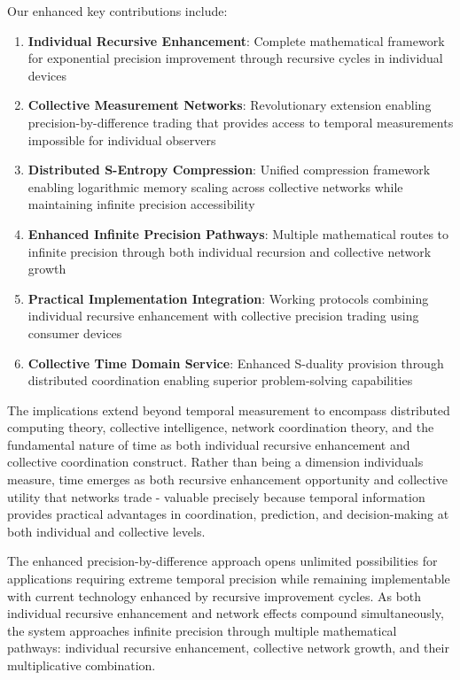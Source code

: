 \documentclass[12pt,a4paper]{article}
\begin{document}
Our enhanced key contributions include:

\begin{enumerate}
\item \textbf{Individual Recursive Enhancement}: Complete mathematical framework for exponential precision improvement through recursive cycles in individual devices

\item \textbf{Collective Measurement Networks}: Revolutionary extension enabling precision-by-difference trading that provides access to temporal measurements impossible for individual observers

\item \textbf{Distributed S-Entropy Compression}: Unified compression framework enabling logarithmic memory scaling across collective networks while maintaining infinite precision accessibility

\item \textbf{Enhanced Infinite Precision Pathways}: Multiple mathematical routes to infinite precision through both individual recursion and collective network growth

\item \textbf{Practical Implementation Integration}: Working protocols combining individual recursive enhancement with collective precision trading using consumer devices

\item \textbf{Collective Time Domain Service}: Enhanced S-duality provision through distributed coordination enabling superior problem-solving capabilities
\end{enumerate}

The implications extend beyond temporal measurement to encompass distributed computing theory, collective intelligence, network coordination theory, and the fundamental nature of time as both individual recursive enhancement and collective coordination construct. Rather than being a dimension individuals measure, time emerges as both recursive enhancement opportunity and collective utility that networks trade - valuable precisely because temporal information provides practical advantages in coordination, prediction, and decision-making at both individual and collective levels.

The enhanced precision-by-difference approach opens unlimited possibilities for applications requiring extreme temporal precision while remaining implementable with current technology enhanced by recursive improvement cycles. As both individual recursive enhancement and network effects compound simultaneously, the system approaches infinite precision through multiple mathematical pathways: individual recursive enhancement, collective network growth, and their multiplicative combination.
\end{document}
